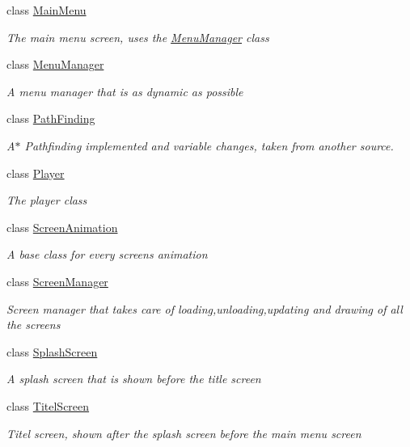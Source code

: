\begin{DoxyCompactItemize}
class \hyperlink{class_pacman_1_1_main_menu}{Main\-Menu}
\begin{DoxyCompactList}\small\item\em The main menu screen, uses the \hyperlink{class_pacman_1_1_menu_manager}{Menu\-Manager} class \end{DoxyCompactList}\item 
class \hyperlink{class_pacman_1_1_menu_manager}{Menu\-Manager}
\begin{DoxyCompactList}\small\item\em A menu manager that is as dynamic as possible \end{DoxyCompactList}\item 
class \hyperlink{class_pacman_1_1_path_finding}{Path\-Finding}
\begin{DoxyCompactList}\small\item\em A$\ast$ Pathfinding implemented and variable changes, taken from another source. \end{DoxyCompactList}\item 
class \hyperlink{class_pacman_1_1_player}{Player}
\begin{DoxyCompactList}\small\item\em The player class \end{DoxyCompactList}\item 
class \hyperlink{class_pacman_1_1_screen_animation}{Screen\-Animation}
\begin{DoxyCompactList}\small\item\em A base class for every screens animation \end{DoxyCompactList}\item 
class \hyperlink{class_pacman_1_1_screen_manager}{Screen\-Manager}
\begin{DoxyCompactList}\small\item\em Screen manager that takes care of loading,unloading,updating and drawing of all the screens \end{DoxyCompactList}\item 
class \hyperlink{class_pacman_1_1_splash_screen}{Splash\-Screen}
\begin{DoxyCompactList}\small\item\em A splash screen that is shown before the title screen \end{DoxyCompactList}\item 
class \hyperlink{class_pacman_1_1_titel_screen}{Titel\-Screen}
\begin{DoxyCompactList}\small\item\em Titel screen, shown after the splash screen before the main menu screen \end{DoxyCompactList}\end{DoxyCompactItemize}
